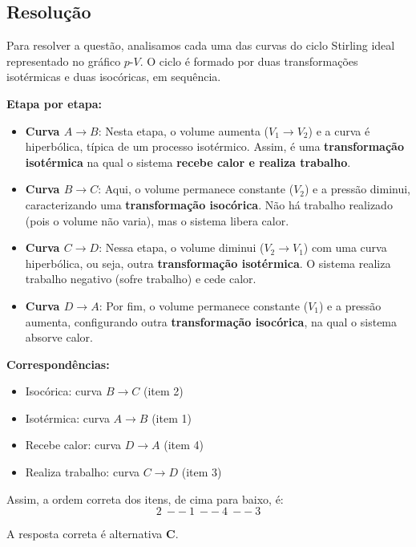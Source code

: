 \documentclass[a4paper,12pt]{article}
\begin{document}
\begin{flushleft}
\section*{Resolução}

Para resolver a questão, analisamos cada uma das curvas do ciclo Stirling ideal representado no gráfico \(p\)-\(V\). O ciclo é formado por duas transformações isotérmicas e duas isocóricas, em sequência.

\bigskip

\textbf{Etapa por etapa:}

\begin{itemize}
    \item \textbf{Curva \( A \to B \)}: 
    Nesta etapa, o volume aumenta (\(V_1 \to V_2\)) e a curva é hiperbólica, típica de um processo isotérmico. Assim, é uma \textbf{transformação isotérmica} na qual o sistema \textbf{recebe calor e realiza trabalho}.
    
    \item \textbf{Curva \( B \to C \)}:
    Aqui, o volume permanece constante (\(V_2\)) e a pressão diminui, caracterizando uma \textbf{transformação isocórica}. Não há trabalho realizado (pois o volume não varia), mas o sistema libera calor.
    
    \item \textbf{Curva \( C \to D \)}:
    Nessa etapa, o volume diminui (\(V_2 \to V_1\)) com uma curva hiperbólica, ou seja, outra \textbf{transformação isotérmica}. O sistema realiza trabalho negativo (sofre trabalho) e cede calor.
    
    \item \textbf{Curva \( D \to A \)}:
    Por fim, o volume permanece constante (\(V_1\)) e a pressão aumenta, configurando outra \textbf{transformação isocórica}, na qual o sistema absorve calor.
\end{itemize}

\bigskip

\textbf{Correspondências:}

\begin{itemize}
    \item Isocórica: curva \( B \to C \) (item 2)
    \item Isotérmica: curva \( A \to B \) (item 1)
    \item Recebe calor: curva \( D \to A \) (item 4)
    \item Realiza trabalho: curva \( C \to D \) (item 3)
\end{itemize}

Assim, a ordem correta dos itens, de cima para baixo, é:
\[
\boxed{2 \ -- \ 1 \ -- \ 4 \ -- \ 3}
\]

\bigskip

A resposta correta é alternativa \colorbox{green!50}{\textbf{C}}.
\end{flushleft}
\end{document}
